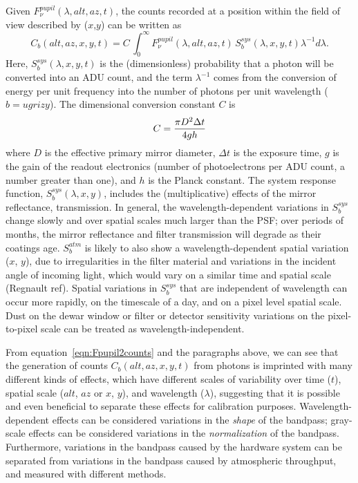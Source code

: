 \documentclass[12pt,preprint]{aastex}
\begin{document}
Given $F_\nu^{pupil}(\lambda,alt,az,t)$, the counts recorded at a
position within the field of view described by ($x$,$y$) can be
written as
\begin{equation}
\label{eqn:Fpupil2counts}
    C_b(alt,az,x,y,t) = C \, \int_0^\infty {F_\nu^{pupil}(\lambda,alt,az,t) \, S_b^{sys}(\lambda,x,y,t) \lambda^{-1}d\lambda}.
\end{equation}
Here, $S_b^{sys}(\lambda,x,y,t)$ is the (dimensionless) probability
that a photon will be converted into an ADU count, and the term
$\lambda^{-1}$ comes from the conversion of energy per unit frequency
into the number of photons per unit wavelength ($b=ugrizy$). The
dimensional conversion constant $C$ is
\begin{equation}
\label{eqn:Cconstant}
        C = {\pi D^2 \Delta t \over 4 g h }  
\end{equation}
where $D$ is the effective primary mirror diameter, $\Delta t$ is the
exposure time, $g$ is the gain of the readout electronics (number of
photoelectrons per ADU count, a number greater than one), and $h$ is
the Planck constant. The system response function,
$S_b^{sys}(\lambda,x,y)$, includes the (multiplicative) effects of the
mirror reflectance, transmission. In general, the wavelength-dependent
variations in $S_b^{sys}$ change slowly and over spatial scales much
larger than the PSF; over periods of months, the mirror reflectance
and filter transmission will degrade as their coatings
age. $S_b^{atm}$ is likely to also show a wavelength-dependent spatial
variation ($x$, $y$), due to irregularities in the filter material and
variations in the incident angle of incoming light, which would vary
on a similar time and spatial scale (Regnault ref). Spatial variations
in $S_b^{sys}$ that are independent of wavelength can occur more
rapidly, on the timescale of a day, and on a pixel level spatial
scale. Dust on the dewar window or filter or detector sensitivity
variations on the pixel-to-pixel scale can be treated as
wavelength-independent. 

From equation~\ref{eqn:Fpupil2counts} and the paragraphs above, we can see
that the generation of counts $C_b(alt,az,x,y,t)$ from photons is
imprinted with many different kinds of effects, which have different
scales of variability over time ($t$), spatial scale ($alt$, $az$ or
$x$, $y$), and wavelength ($\lambda$), suggesting that it is possible
and even beneficial to separate these effects for calibration
purposes. Wavelength-dependent effects can be considered variations in
the {\it shape} of the bandpass; gray-scale effects can be considered
variations in the {\it normalization} of the bandpass. Furthermore,
variations in the bandpass caused by the hardware system can be
separated from variations in the bandpass caused by atmospheric
throughput, and measured with different methods. 
\end{document}
